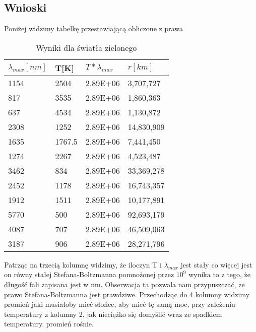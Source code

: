 \documentclass{article}
\begin{document}
\subsection{Wnioski}
Poniżej widzimy tabelkę przestawiającą obliczone z prawa
\begin{table}[h!]
\centering
\begin{tabular}{|l|l|l|l|}
\hline
$ \lambda_{max}[nm]$ & T[K] & $T*\lambda_{max}$ & $r[km]$ \\ \hline
1154 & 2504 & 2.89E+06 & 3,707,727 \\
817 & 3535 & 2.89E+06 & 1,860,363 \\
637 & 4534 & 2.89E+06 & 1,130,872 \\
2308 & 1252 & 2.89E+06 & 14,830,909 \\
1635 & 1767.5 & 2.89E+06 & 7,441,450 \\
1274 & 2267 & 2.89E+06 & 4,523,487 \\
3462 & 834 & 2.89E+06 & 33,369,278 \\
2452 & 1178 & 2.89E+06 & 16,743,357 \\
1912 & 1511 & 2.89E+06 & 10,177,891 \\
5770 & 500 & 2.89E+06 & 92,693,179 \\
4087 & 707 & 2.89E+06 & 46,509,063 \\
3187 & 906 & 2.89E+06 & 28,271,796 \\
\hline
\end{tabular}
\caption{Wyniki dla światła zielonego}
\end{table}
Patrząc na trzecią kolumnę widzimy, że iloczyn T i $\lambda_{max}$ jest stały co więcej jest on równy stałej Stefana-Boltzmanna pomnożonej przez $10^9$ wynika to z tego, że długość fali zapisana jest w nm. Obserwacja ta pozwala nam przypuszczać, ze prawo Stefana-Boltzmanna jest prawdziwe. Przechodząc do 4 kolumny widzimy promień jaki musiałoby mieć słońce, aby mieć tę samą moc, przy zależeniu temperatury z kolumny 2, jak nieciężko się domyślić wraz ze spadkiem temperatury, promień rośnie.
\end{document}
